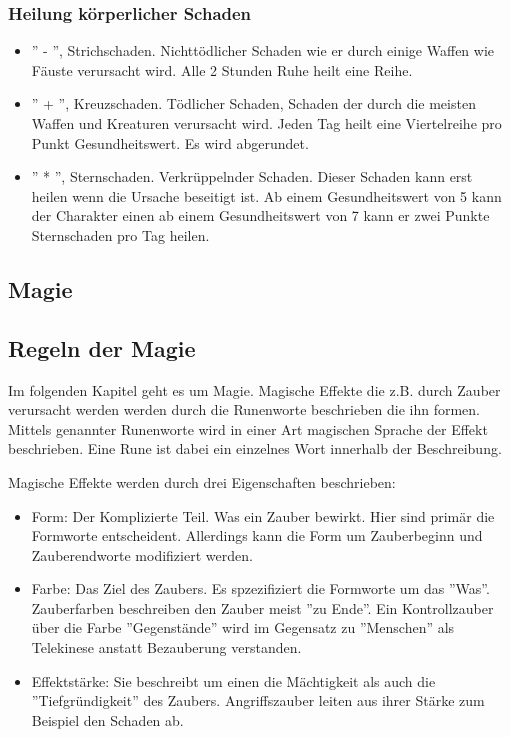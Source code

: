 \documentclass{article}
\begin{document}
\subsubsection{Heilung körperlicher Schaden}

\begin{itemize}
\item '' - '', Strichschaden. Nichttödlicher Schaden wie er durch einige Waffen wie Fäuste verursacht wird. Alle 2 Stunden Ruhe heilt eine Reihe.
\item '' + '', Kreuzschaden. Tödlicher Schaden, Schaden der durch die meisten Waffen und Kreaturen verursacht wird. Jeden Tag heilt eine Viertelreihe pro Punkt Gesundheitswert. Es wird abgerundet.
\item '' * '', Sternschaden. Verkrüppelnder Schaden. Dieser Schaden kann erst heilen wenn die Ursache beseitigt ist. Ab einem Gesundheitswert von 5 kann der Charakter einen ab einem Gesundheitswert von 7 kann er zwei Punkte Sternschaden pro Tag heilen.
\end{itemize}

\begin{center}
\section{Magie}
\end{center}

\begin{center}
\subsection{Regeln der Magie}
\end{center}

Im folgenden Kapitel geht es um Magie. Magische Effekte die z.B. durch Zauber verursacht werden werden durch die
Runenworte beschrieben die ihn formen. Mittels genannter Runenworte wird in einer Art magischen Sprache der Effekt
beschrieben. Eine Rune ist dabei ein einzelnes Wort innerhalb der Beschreibung.

Magische Effekte werden durch drei Eigenschaften beschrieben:

\begin{itemize}
\item Form: Der Komplizierte Teil. Was ein Zauber bewirkt. Hier sind primär die Formworte entscheident. Allerdings kann die Form um Zauberbeginn und Zauberendworte modifiziert werden.
\item Farbe: Das Ziel des Zaubers. Es spzezifiziert die Formworte um das ''Was''. Zauberfarben beschreiben den Zauber meist ''zu Ende''. Ein Kontrollzauber über die Farbe ''Gegenstände'' wird im Gegensatz zu ''Menschen'' als Telekinese anstatt Bezauberung verstanden.
\item Effektstärke: Sie beschreibt um einen die Mächtigkeit als auch die ''Tiefgründigkeit'' des Zaubers. Angriffszauber leiten aus ihrer Stärke zum Beispiel den Schaden ab.
\end{itemize}
\end{document}
